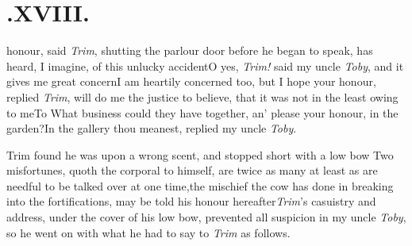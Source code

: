 \documentclass{article}
\begin{document}
\medskip
\section{.\enspace XVIII.}

 honour, said \textit{Trim}, shutting\break
the parlour door before he began\break
to speak, has heard, I imagine, of this
unlucky accident\tsk\tsk O yes,
\textit{Trim!} said my uncle \textit{Toby}, and it gives me
great\break
concern\tsk I am heartily concerned too, but I hope your honour,
replied \textit{Trim},\break
will do me the justice to believe, that it was
not in the least owing to me\tsh To
What business could they have together, an’ please your honour, in
the garden?\tsk\break In the gallery thou meanest, replied my
uncle \textit{Toby}.

Trim found he was upon a wrong\break
scent, and stopped short with a low bow\break
\tsh Two misfortunes, quoth the corporal to
himself, are twice as many at least as are needful to be talked
over at one time,\break\tsh the mischief the cow has done in
breaking into the fortifications, may be 
told his honour hereafter\tsk \textit{Trim}’s casuistry and address,
under the cover of his low bow, prevented all suspicion in my uncle
\textit{Toby}, so he went on with what he had to say to \textit{Trim}
as follows.
\end{document}
